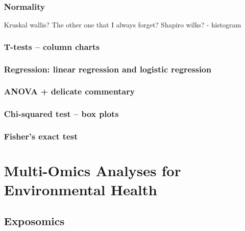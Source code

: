 \documentclass[
]{article}
\begin{document}
\hypertarget{normality}{%
\subsubsection{Normality}\label{normality}}

Kruskal wallis? The other one that I always forget? Shapiro wilks? - histogram

\hypertarget{t-tests-column-charts}{%
\subsubsection{T-tests -- column charts}\label{t-tests-column-charts}}

\hypertarget{regression-linear-regression-and-logistic-regression}{%
\subsubsection{Regression: linear regression and logistic regression}\label{regression-linear-regression-and-logistic-regression}}

\hypertarget{anova-delicate-commentary}{%
\subsubsection{ANOVA + delicate commentary}\label{anova-delicate-commentary}}

\hypertarget{chi-squared-test-box-plots}{%
\subsubsection{Chi-squared test -- box plots}\label{chi-squared-test-box-plots}}

\hypertarget{fishers-exact-test}{%
\subsubsection{Fisher's exact test}\label{fishers-exact-test}}

\hypertarget{multi-omics-analyses-for-environmental-health}{%
\section{Multi-Omics Analyses for Environmental Health}\label{multi-omics-analyses-for-environmental-health}}

\hypertarget{exposomics}{%
\subsection{Exposomics}\label{exposomics}}
\end{document}
